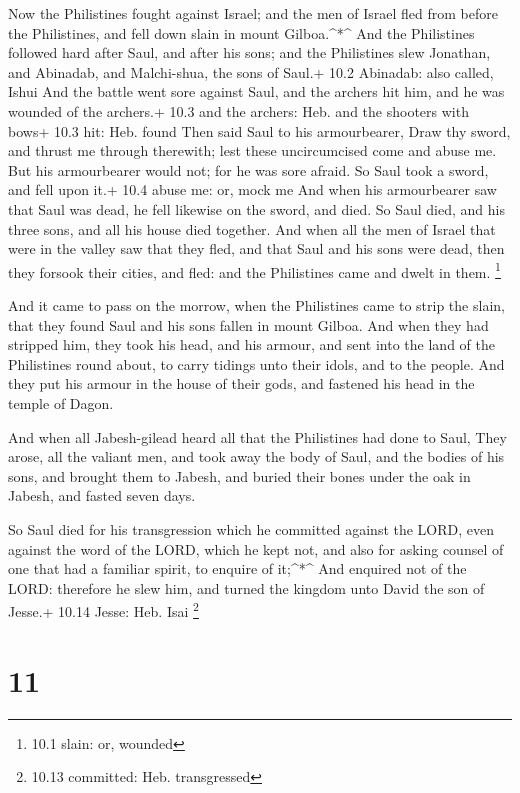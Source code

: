  Now the Philistines fought against Israel; and the men of
Israel fled from before the Philistines, and fell down slain in mount
Gilboa.\^{}*\^{}  And the Philistines followed hard after
Saul, and after his sons; and the Philistines slew Jonathan, and
Abinadab, and Malchi-shua, the sons of Saul.+ 10.2 Abinadab: also
called, Ishui  And the battle went sore against Saul, and
the archers hit him, and he was wounded of the archers.+ 10.3 and the
archers: Heb. and the shooters with bows+ 10.3 hit: Heb. found
 Then said Saul to his armourbearer, Draw thy sword, and
thrust me through therewith; lest these uncircumcised come and abuse me.
But his armourbearer would not; for he was sore afraid. So Saul took a
sword, and fell upon it.+ 10.4 abuse me: or, mock me  And
when his armourbearer saw that Saul was dead, he fell likewise on the
sword, and died.  So Saul died, and his three sons, and all
his house died together.  And when all the men of Israel
that were in the valley saw that they fled, and that Saul and his sons
were dead, then they forsook their cities, and fled: and the Philistines
came and dwelt in them. \footnote{10.1 slain: or, wounded}

 And it came to pass on the morrow, when the Philistines
came to strip the slain, that they found Saul and his sons fallen in
mount Gilboa.  And when they had stripped him, they took his
head, and his armour, and sent into the land of the Philistines round
about, to carry tidings unto their idols, and to the people.
 And they put his armour in the house of their gods, and
fastened his head in the temple of Dagon.

 And when all Jabesh-gilead heard all that the Philistines
had done to Saul,  They arose, all the valiant men, and
took away the body of Saul, and the bodies of his sons, and brought them
to Jabesh, and buried their bones under the oak in Jabesh, and fasted
seven days.

 So Saul died for his transgression which he committed
against the LORD, even against the word of the LORD, which he kept not,
and also for asking counsel of one that had a familiar spirit, to
enquire of it;\^{}*\^{}  And enquired not of the LORD:
therefore he slew him, and turned the kingdom unto David the son of
Jesse.+ 10.14 Jesse: Heb. Isai \footnote{10.13 committed: Heb.
  transgressed}

\hypertarget{section-10}{%
\section{11}\label{section-10}}

